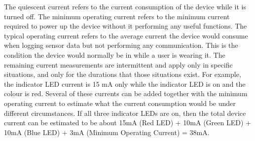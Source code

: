 The quiescent current refers to the current consumption of the device while 
it is turned off. The minimum operating current refers to the minimum current 
required to power up the device without it performing any useful functions. 
The typical operating current refers to the average current the device would 
consume when logging sensor data but not performing any communication. This is 
the condition the device would normally be in while a user is wearing it. The 
remaining current measurements are intermittent and apply only in specific 
situations, and only for the durations that those situations exist. For example, 
the indicator LED current is 15 mA only while the indicator LED is on and the 
colour is red. Several of these currents can be added together with the minimum 
operating current to estimate what the current consumption would be under 
different circumstances. If all three indicator LEDs are on, then the total 
device current can be estimated to be about 15mA (Red LED) + 10mA (Green LED) 
+ 10mA (Blue LED) + 3mA (Minimum Operating Current) = 38mA.

